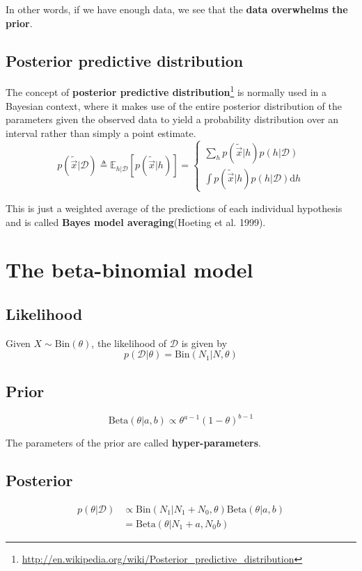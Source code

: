 In other words, if we have enough data, we see that the \textbf{data overwhelms the prior}.


\subsection{Posterior predictive distribution}
The concept of \textbf{posterior predictive distribution}\footnote{\url{http://en.wikipedia.org/wiki/Posterior_predictive_distribution}} is normally used in a Bayesian context, where it makes use of the entire posterior distribution of the parameters given the observed data to yield a probability distribution over an interval rather than simply a point estimate. 
\begin{equation}
p(\tilde{\vec{x}}|\mathcal{D}) \triangleq \mathbb{E}_{h|\mathcal{D}}[p(\tilde{\vec{x}}|h)] = \begin{cases}
\sum_h p(\tilde{\vec{x}}|h)p(h|\mathcal{D}) \\
\int p(\tilde{\vec{x}}|h)p(h|\mathcal{D})\mathrm{d}h
\end{cases}
\end{equation}

This is just a weighted average of the predictions of each individual hypothesis and is called \textbf{Bayes model averaging}(Hoeting et al. 1999). 


\section{The beta-binomial model}


\subsection{Likelihood}
Given $X \sim \text{Bin}(\theta)$, the likelihood of $\mathcal{D}$ is given by
\begin{equation}
p(\mathcal{D}|\theta)= \text{Bin}(N_1|N,\theta)
\end{equation}


\subsection{Prior}
\begin{equation}
\text{Beta}(\theta|a,b) \propto \theta^{a-1}(1-\theta)^{b-1}
\end{equation}

The parameters of the prior are called \textbf{hyper-parameters}.


\subsection{Posterior}
\begin{equation}\begin{split}\label{eqn:beta-binomial-posterior}
p(\theta|\mathcal{D}) & \propto \text{Bin}(N_1|N_1+N_0,\theta)\text{Beta}(\theta|a,b) \\
    & =\text{Beta}(\theta|N_1+a,N_0b)
\end{split}\end{equation}

